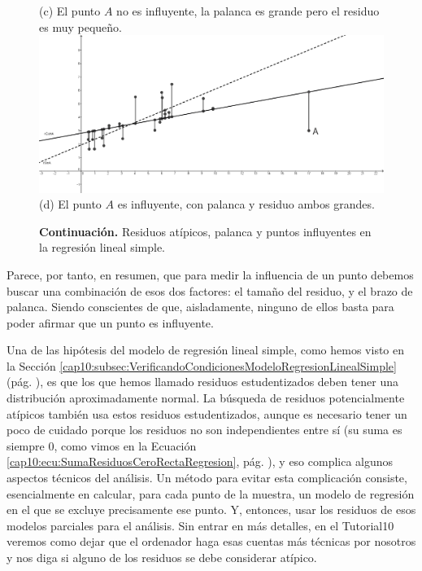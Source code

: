 \begin{figure}[p]
\begin{center}
\begin{bn}
(c) El punto $A$ no es influyente, la palanca es grande pero el residuo es muy peque\~no.\\[7mm]
\includegraphics[width=13cm]{../fig/Cap10-PuntosInfluyentesRegresion-03-bn.png}\\[3mm]
(d) El punto $A$ es influyente, con palanca y residuo ambos grandes.\\[3mm]
\end{bn}
\caption{{\bf Continuación.} Residuos atípicos, palanca y puntos influyentes en la regresión lineal simple.}
\end{center}
\end{figure}

Parece, por tanto, en resumen, que para medir la influencia de un punto debemos buscar una combinación de esos dos factores: el tamaño del residuo, y el brazo de palanca. Siendo conscientes de que, aisladamente, ninguno de ellos basta para poder afirmar que un punto es influyente.

Una de las hipótesis del modelo de regresión lineal simple, como hemos visto en la Sección \ref{cap10:subsec:VerificandoCondicionesModeloRegresionLinealSimple} (pág. \pageref{cap10:subsec:VerificandoCondicionesModeloRegresionLinealSimple}), es que los que hemos llamado residuos estudentizados deben tener una distribución aproximadamente normal.  La búsqueda de residuos potencialmente atípicos también usa estos residuos estudentizados, aunque es necesario tener un poco de cuidado porque los residuos no son independientes entre sí (su suma es siempre $0$, como vimos en la Ecuación \ref{cap10:ecu:SumaResiduosCeroRectaRegresion}, pág. \pageref{cap10:ecu:SumaResiduosCeroRectaRegresion}), y eso complica algunos aspectos técnicos del análisis. Un método para evitar esta complicación consiste, esencialmente en calcular, para cada punto de la muestra, un modelo de regresión en el que se excluye precisamente ese punto. Y, entonces, usar los residuos de esos modelos parciales para el análisis. Sin entrar en más detalles, en el Tutorial10 veremos como dejar que el ordenador haga esas cuentas más técnicas por nosotros y nos diga si alguno de los residuos se debe considerar atípico.

